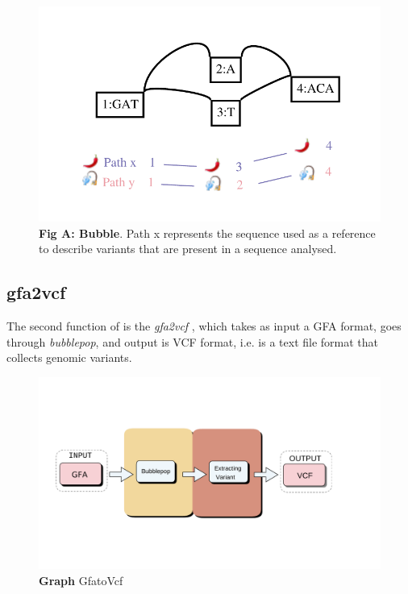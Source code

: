\begin{figure}[H]
\centering
\includegraphics[width=1.10\textwidth]{fig/GraphchrXnew.pdf}
\decoRule
\caption{\textbf{Fig A: Bubble}. Path x represents the sequence used as a reference to describe variants that are present in a sequence analysed.} %
\label{fig:bubble.png}
\end{figure}





\subsection{gfa2vcf}

The second function of \vgp is the \textit{gfa2vcf} , which takes as input a GFA format, goes through \textit{bubblepop}, and output is VCF format, i.e. is a text file format that collects genomic variants.



\begin{figure}[H]
\centering
\includegraphics[width=1.10\textwidth]{fig/gfatovcfnew.pdf}
\decoRule
\caption{\textbf{Graph} GfatoVcf}
\label{fig:vgpop.pdf}
\end{figure}



